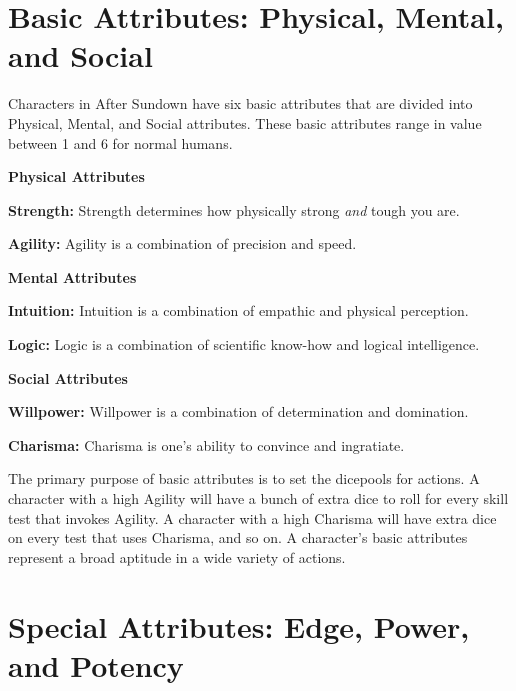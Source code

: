 \section[Basic Attributes]{Basic Attributes: Physical, Mental, and Social}

\hspace{\parindent} Characters in After Sundown have six basic attributes that are divided into Physical, Mental, and Social attributes. These basic attributes range in value between 1 and 6 for normal humans.

\textbf{Physical Attributes}

\hspace{\parindent}\textbf{Strength:} Strength determines how physically strong \textit{and} tough you are.

\hspace{\parindent}\textbf{Agility:} Agility is a combination of precision and speed.

\textbf{Mental Attributes}

\hspace{\parindent}\textbf{Intuition:} Intuition is a combination of empathic and physical perception.

\hspace{\parindent}\textbf{Logic:} Logic is a combination of scientific know-how and logical intelligence.

\textbf{Social Attributes}

\hspace{\parindent}\textbf{Willpower:} Willpower is a combination of determination and domination.

\hspace{\parindent}\textbf{Charisma:} Charisma is one's ability to convince and ingratiate.

The primary purpose of basic attributes is to set the dicepools for actions. A character with a high Agility will have a bunch of extra dice to roll for every skill test that invokes Agility. A character with a high Charisma will have extra dice on every test that uses Charisma, and so on. A character's basic attributes represent a broad aptitude in a wide variety of actions.

\section[Special Attributes]{Special Attributes: Edge, Power, and Potency}

